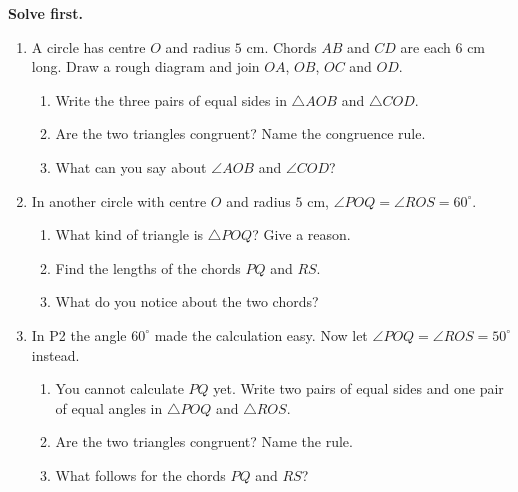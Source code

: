 \documentclass[11pt,a4paper]{article}
\theoremstyle{branddef}
\newcommand{\tr}{\triangle}
\newcounter{prob}
\newenvironment{solvefirst}
  {\par\smallskip\noindent\textbf{Solve first.}
   \begin{enumerate}[label=\textbf{P\arabic*.},leftmargin=2.2em,itemsep=3pt,start=\numexpr\value{prob}+1\relax]}
  {\setcounter{prob}{\value{enumi}}\end{enumerate}}
\begin{document}
\begin{solvefirst}
  \item A circle has centre $O$ and radius $5$ cm. Chords $AB$ and $CD$ are each $6$ cm long. Draw a rough diagram and join $OA$, $OB$, $OC$ and $OD$.
  \begin{enumerate}[label=(\alph*),itemsep=1pt]
    \item Write the three pairs of equal sides in $\tr AOB$ and $\tr COD$.
    \item Are the two triangles congruent? Name the congruence rule.
    \item What can you say about $\angle AOB$ and $\angle COD$?
  \end{enumerate}
  \item In another circle with centre $O$ and radius $5$ cm, $\angle POQ=\angle ROS=60^\circ$.
  \begin{enumerate}[label=(\alph*),itemsep=1pt]
    \item What kind of triangle is $\tr POQ$? Give a reason.
    \item Find the lengths of the chords $PQ$ and $RS$.
    \item What do you notice about the two chords?
  \end{enumerate}
  \item In P2 the angle $60^\circ$ made the calculation easy. Now let $\angle POQ=\angle ROS=50^\circ$ instead.
  \begin{enumerate}[label=(\alph*),itemsep=1pt]
    \item You cannot calculate $PQ$ yet. Write two pairs of equal sides and one pair of equal angles in $\tr POQ$ and $\tr ROS$.
    \item Are the two triangles congruent? Name the rule.
    \item What follows for the chords $PQ$ and $RS$?
  \end{enumerate}
\end{solvefirst}
\end{document}
